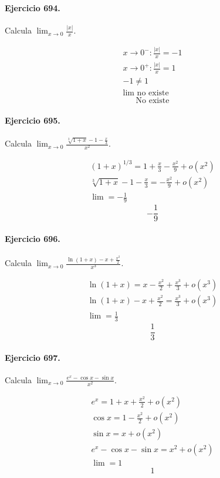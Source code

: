 \documentclass[11pt,a4paper]{article}
\begin{document}
\paragraph{Ejercicio 694.} Calcula $\displaystyle \lim_{x\to0}\frac{|x|}{x}$.

\[
\begin{aligned}
x\to0^-:\frac{|x|}{x}=-1\\
x\to0^+:\frac{|x|}{x}=1\\
-1\ne1\\
\lim\text{{ no existe}}
\end{aligned}
\]
\[\boxed{\text{{No existe}}}\]


\paragraph{Ejercicio 695.} Calcula $\displaystyle \lim_{x\to0}\frac{\sqrt[3]{1+x}-1-\frac{x}{3}}{x^2}$.

\[
\begin{aligned}
(1+x)^{1/3}=1+\frac{x}{3}-\frac{x^2}{9}+o(x^2)\\
\sqrt[3]{1+x}-1-\frac{x}{3}=-\frac{x^2}{9}+o(x^2)\\
\lim=-\frac19
\end{aligned}
\]
\[\boxed{-\frac19}\]


\paragraph{Ejercicio 696.} Calcula $\displaystyle \lim_{x\to0}\frac{\ln(1+x)-x+\frac{x^2}{2}}{x^3}$.

\[
\begin{aligned}
\ln(1+x)=x-\frac{x^2}{2}+\frac{x^3}{3}+o(x^3)\\
\ln(1+x)-x+\frac{x^2}{2}=\frac{x^3}{3}+o(x^3)\\
\lim=\frac13
\end{aligned}
\]
\[\boxed{\frac13}\]


\paragraph{Ejercicio 697.} Calcula $\displaystyle \lim_{x\to0}\frac{e^x-\cos x-\sin x}{x^2}$.

\[
\begin{aligned}
e^x=1+x+\frac{x^2}{2}+o(x^2)\\
\cos x=1-\frac{x^2}{2}+o(x^2)\\
\sin x=x+o(x^2)\\
e^x-\cos x-\sin x=x^2+o(x^2)\\
\lim=1
\end{aligned}
\]
\[\boxed{1}\]
\end{document}
